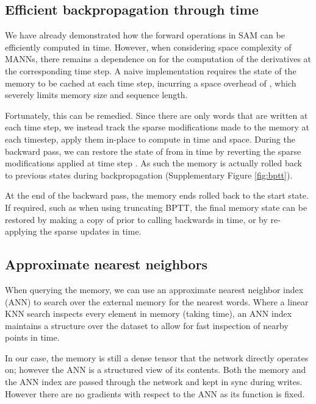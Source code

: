 \documentclass{article}
\begin{document}
\subsection{Efficient backpropagation through time}
\label{sec:efficient_bptt}

We have already demonstrated how the forward operations in SAM can be efficiently computed in  time. However, when considering space complexity of MANNs, there remains a dependence on  for the computation of the derivatives at the corresponding time step. A naive implementation requires the state of the memory to be cached at each time step, incurring a space overhead of , which severely limits memory size and sequence length.

Fortunately, this can be remedied. Since there are only  words that are written at each time step, we instead track the sparse modifications made to the memory at each timestep, apply them in-place to compute  in  time and  space. During the backward pass, we can restore the state of  from  in  time by reverting the sparse modifications applied at time step . As such the memory is actually rolled back to previous states during backpropagation (Supplementary Figure \ref{fig:bptt}).

At the end of the backward pass, the memory ends rolled back to the start state. If required, such as when using truncating BPTT, the final memory state can be restored by making a copy of  prior to calling backwards in  time, or by re-applying the  sparse updates in  time.









\subsection{Approximate nearest neighbors}
\label{sec:ann}

When querying the memory, we can use an approximate nearest neighbor index (ANN) to search over the external memory for the  nearest words.
Where a linear KNN search inspects every element in memory (taking  time), an ANN index maintains a structure over the dataset to allow for fast inspection of nearby points in  time.

In our case, the memory is still a dense tensor that the network directly operates on; however the ANN is a structured view of its contents. Both the memory and the ANN index are passed through the network and kept in sync during writes. However there are no gradients with respect to the ANN as its function is fixed.
\end{document}
